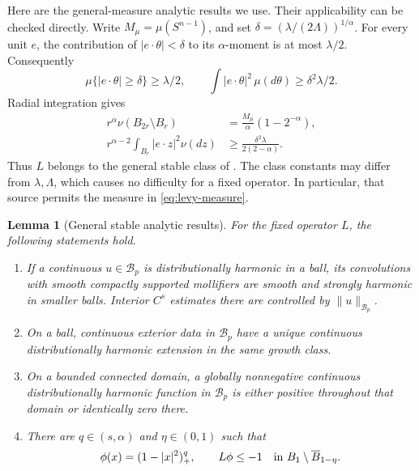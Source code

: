 \documentclass[11pt]{article}
\newtheorem{lemma}[theorem]{Lemma}
\numberwithin{equation}{section}
\newcommand{\Bcal}{\mathcal B}
\begin{document}
Here are the general-measure analytic results we use. Their applicability
can be checked directly. Write \(M_\mu=\mu(S^{n-1})\), and set
\(\delta=(\lambda/(2\Lambda))^{1/\alpha}\).
For every unit \(e\), the contribution of \(|e\cdot\theta|<\delta\)
to its \(\alpha\)-moment is at most \(\lambda/2\). Consequently
\begin{equation}\label{eq:angular-cap}
 \mu\{|e\cdot\theta|\ge\delta\}\ge\lambda/2,
 \qquad \int|e\cdot\theta|^2\,\mu(d\theta)
                  \ge\delta^2\lambda/2.
\end{equation}
Radial integration gives
\begin{align}
 r^\alpha\nu(B_{2r}\setminus B_r)
       &=\frac{M_\mu}{\alpha}(1-2^{-\alpha}),\label{eq:class-upper}\\
 r^{\alpha-2}\int_{B_r}|e\cdot z|^2\nu(dz)
       &\ge\frac{\delta^2\lambda}{2(2-\alpha)}.\label{eq:class-lower}
\end{align}
Thus \(L\) belongs to the general stable class of
\cite[Definitions 2.1.18 and 2.1.21]{FR}. The class constants may differ
from \(\lambda,\Lambda\), which causes no difficulty for a fixed operator.
In particular, that source permits the measure in \eqref{eq:levy-measure}.

\begin{lemma}[General stable analytic results]\label{lem:inputs}
For the fixed operator \(L\), the following statements hold.
\begin{enumerate}
\item If a continuous \(u\in\Bcal_p\) is distributionally harmonic in a ball, its
convolutions with smooth compactly supported mollifiers are smooth and
strongly harmonic in smaller balls. Interior \(C^s\) estimates there are
controlled by \(\|u\|_{\Bcal_p}\).
\item On a ball, continuous exterior data in \(\Bcal_p\) have a unique
continuous distributionally harmonic extension in the same growth class.
\item On a bounded connected domain, a globally nonnegative continuous
distributionally harmonic function in \(\Bcal_p\) is either positive
throughout that domain or identically zero there.
\item There are \(q\in(s,\alpha)\) and \(\eta\in(0,1)\) such that
\begin{equation}\label{eq:ball-barrier}
 \phi(x)=(1-|x|^2)_+^q,\qquad
 L\phi\le-1\quad\hbox{in }B_1\setminus\overline B_{1-\eta}.
\end{equation}
\end{enumerate}
\end{lemma}
\end{document}
